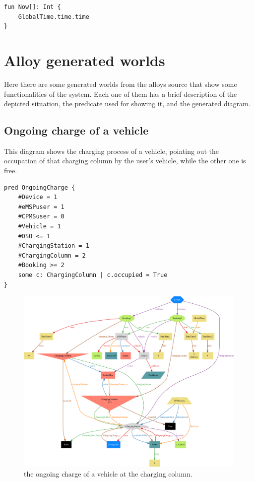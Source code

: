 \begin{verbatim}
fun Now[]: Int {
    GlobalTime.time.time
}
\end{verbatim}

\pagebreak

\section{Alloy generated worlds}

Here there are some generated worlds from the alloys source that show some functionalities of the system. Each one of them has a brief description of the depicted situation, the predicate used for showing it, and the generated diagram.

\subsection{Ongoing charge of a vehicle}

This diagram shows the charging process of a vehicle, pointing out the occupation of that charging column by the user's vehicle, while the other one is free.

\begin{verbatim}
pred OngoingCharge {
    #Device = 1
    #eMSPuser = 1
    #CPMSuser = 0
    #Vehicle = 1
    #DSO <= 1
    #ChargingStation = 1
    #ChargingColumn = 2
    #Booking >= 2
    some c: ChargingColumn | c.occupied = True
}
\end{verbatim}

\begin{figure}[h!]
    \centering
    \includegraphics[width=\columnwidth]{./images/alloy/ongoingCharge}
    \caption{the ongoing charge of a vehicle at the charging column.}
\end{figure}


